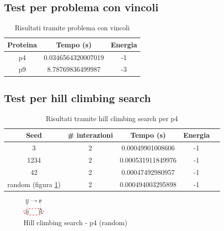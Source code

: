 \documentclass[conference]{IEEEtran}
\begin{document}
\subsection{Test per problema con vincoli}

\begin{table}[H]
\begin{center}
\begin{tabular}{|c|c|c|}
\hline
\textbf{Proteina} & \textbf{Tempo (s)} & \textbf{Energia} \\ \hline
p4 & 0.0346564320007019 & -1 \\ \hline
p9 & 8.78769836499987 & -3 \\ \hline
\end{tabular}
\end{center}
\caption{Risultati tramite problema con vincoli}
\end{table}

\subsection{Test per hill climbing search}

\begin{table}[h]
\begin{center}
\begin{tabular}{|c|c|c|c|c|}
\hline
\textbf{Seed} & \textbf{\# interazioni} & \textbf{Tempo (s)} & \textbf{Energia} \\ \hline
3 & 2 & 0.00049901008606 & -1 \\ \hline
1234 & 2 & 0.000531911849976 & -1 \\ \hline
42 & 2 & 0.00047492980957 & -1 \\ \hline
random (figura \ref{fig:lsp4}) & 2 & 0.000494003295898 & -1 \\ \hline
\end{tabular}
\end{center}
\caption{Risultati tramite hill climbing search per p4}
\end{table}

\begin{figure}[H]
\centering
\includegraphics[width=0.10\textwidth]{figure/p4LS.png}
\caption{Hill climbing search - p4 (random)}
\label{fig:lsp4}
\end{figure}
\end{document}
